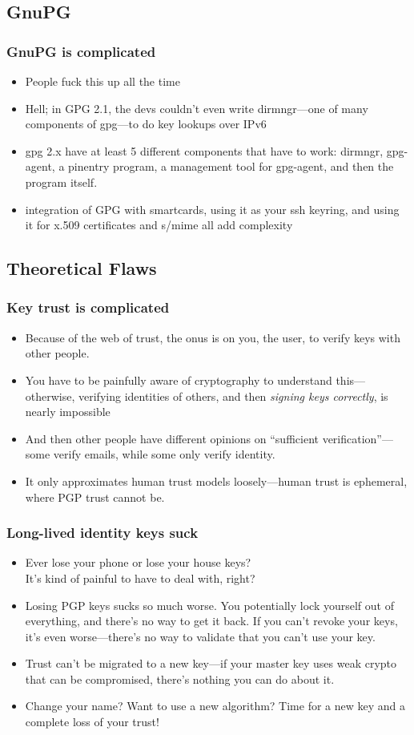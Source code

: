 \documentclass[aspectratio=1610,bigger,utf8]{beamer}
\begin{document}
\subsection{GnuPG}
\begin{frame}
	\frametitle{GnuPG is complicated}
	\begin{itemize}
		\item People fuck this up all the time
		\item Hell; in GPG 2.1, the devs couldn't even write
			dirmngr---one of many components of gpg---to do key
			lookups over IPv6
		\item gpg 2.x have at least 5 different components that have to
			work: dirmngr, gpg-agent, a pinentry program, a
			management tool for gpg-agent, and then the program
			itself.
		\item integration of GPG with smartcards, using it as your ssh
			keyring, and using it for x.509 certificates and s/mime
			all add complexity
	\end{itemize}
\end{frame}
\subsection{Theoretical Flaws}
\begin{frame}
	\frametitle{Key trust is complicated}
	\begin{itemize}
		\item Because of the web of trust, the onus is on you, the
			user, to verify keys with other people.
		\item You have to be \alert{painfully aware of cryptography} to
			understand this---otherwise, verifying identities of
			others, and then \emph{signing keys correctly}, is
			nearly impossible
		\item And then other people have different opinions on
			``sufficient verification''---some verify emails, while
			some only verify identity.
		\item It only approximates human trust models loosely---human
			trust is ephemeral, where PGP trust cannot be.
	\end{itemize}
\end{frame}
\begin{frame}
	\frametitle{Long-lived identity keys suck}
	\begin{itemize}
		\item Ever lose your phone or lose your house keys?\pause\\
			It's kind of \alert{painful} to have to deal with,
			right?\pause
		\item Losing PGP keys sucks so much worse. You potentially
			lock yourself out of everything, and there's no way to
			get it back. If you can't revoke your keys, it's even
			worse---there's no way to validate that you can't use
			your key.\pause
		\item Trust can't be migrated to a new key---if your master key
			uses weak crypto that can be compromised, there's
			nothing you can do about it.
		\item Change your name? Want to use a new algorithm? Time for a
			new key and a complete loss of your trust!
	\end{itemize}
\end{frame}
\end{document}
